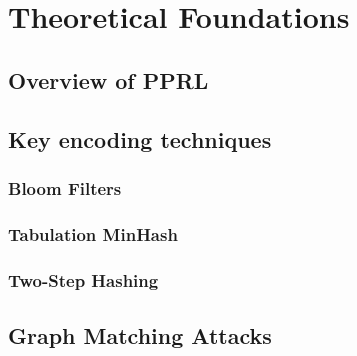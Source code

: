 
\chapter{Theoretical Foundations}  \label{sec:background}

\section{Overview of PPRL}  \label{sec:block-ciphers}

\section{Key encoding techniques}

\subsection{Bloom Filters}

\subsection{Tabulation MinHash}

\subsection{Two-Step Hashing}

\section{Graph Matching Attacks}

